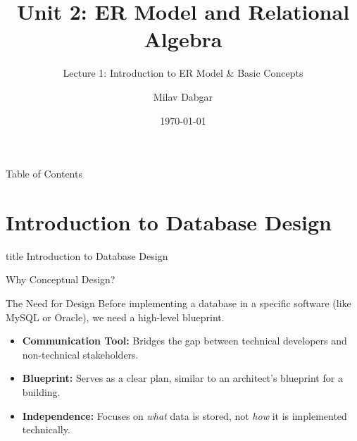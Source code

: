 \documentclass[aspectratio=169, xcolor=dvipsnames]{beamer}
\title[DBMS - Unit 2]{Unit 2: ER Model and Relational Algebra}
\subtitle{Lecture 1: Introduction to ER Model \& Basic Concepts}
\author{Milav Dabgar}
\institute{Diploma in ICT}
\date{\today}
\begin{document}
\begin{frame}
    \titlepage
\end{frame}

\begin{frame}{Table of Contents}
    \tableofcontents
\end{frame}

\section{Introduction to Database Design}

\begin{frame}
  \vfill
  \centering
  \begin{beamercolorbox}[sep=8pt,center,shadow=true,rounded=true]{title}
    Introduction to Database Design\par%
  \end{beamercolorbox}
  \vfill
\end{frame}

\begin{frame}{Why Conceptual Design?}
    \begin{block}{The Need for Design}
    Before implementing a database in a specific software (like MySQL or Oracle), we need a high-level blueprint.
    \end{block}
    
    \vspace{1em}
    
    \begin{itemize}
        \item \textbf{Communication Tool:} Bridges the gap between technical developers and non-technical stakeholders.
        \item \textbf{Blueprint:} Serves as a clear plan, similar to an architect's blueprint for a building.
        \item \textbf{Independence:} Focuses on \textit{what} data is stored, not \textit{how} it is implemented technically.
    \end{itemize}
\end{frame}
\end{document}
